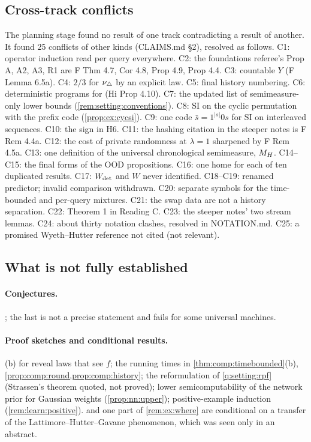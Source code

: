 \subsection{Cross-track conflicts}\label{app:verification:conflicts}

The planning stage found no result of one track contradicting a result of another. It found 25 conflicts of other kinds (CLAIMS.md \S2), resolved as follows. C1: operator induction read per query everywhere. C2: the foundations referee's Prop A, A2, A3, R1 are F Thm 4.7, Cor 4.8, Prop 4.9, Prop 4.4. C3: countable $Y$ (F Lemma 6.5a). C4: $2/3$ for $\nu_{\triangle}$ by an explicit law. C5: final history numbering. C6: deterministic programs for \SFIhist{} (Hi Prop 4.10). C7: the updated list of semimeasure-only lower bounds (\cref{rem:setting:conventions}). C8: SI on the cyclic permutation with the prefix code (\cref{prop:ex:cycsi}). C9: one code $\bar s=1^{|s|}0s$ for SI on interleaved sequences. C10: the sign in H6. C11: the hashing citation in the steeper notes is F Rem 4.4a. C12: the cost of private randomness at $\lambda=1$ sharpened by F Rem 4.5a. C13: one definition of the universal chronological semimeasure, $M_{H}$. C14--C15: the final forms of the OOD propositions. C16: one home for each of ten duplicated results. C17: $W_{\mathrm{det}}$ and $W$ never identified. C18--C19: renamed predictor; invalid comparison withdrawn. C20: separate symbols for the time-bounded and per-query mixtures. C21: the swap data are not a history separation. C22: Theorem 1 in Reading C. C23: the steeper notes' two stream lemmas. C24: about thirty notation clashes, resolved in NOTATION.md. C25: a promised Wyeth--Hutter reference not cited (not relevant).

\subsection{What is not fully established}\label{app:verification:status}

\paragraph{Conjectures.} ; the last is not a precise statement and fails for some universal machines.

\paragraph{Proof sketches and conditional results.} (b) for reveal laws that see $f$; the running times in \cref{thm:comp:timebounded}(b), \cref{prop:comp:round,prop:comp:history}; the reformulation of \cref{q:setting:rpf} (Strassen's theorem quoted, not proved); lower semicomputability of the network prior for Gaussian weights (\cref{prop:nn:upper}); positive-example induction (\cref{rem:learn:positive}).  and one part of \cref{rem:ex:where} are conditional on a transfer of the Lattimore--Hutter--Gavane phenomenon, which was seen only in an abstract.

